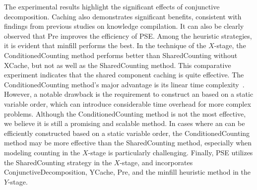 The experimental results highlight the significant effects of conjunctive decomposition.
Caching also demonstrates significant benefits, consistent with findings from previous studies on knowledge compilation. 
It can also be clearly observed that \textsf{Pre} improves the efficiency of PSE.
Among the heuristic strategies, it is evident that \textsf{minfill} performs the best.
In the technique of the $X$-stage, the \textsf{ConditionedCounting} method performs better than \textsf{SharedCounting} without \textsf{XCache}, but not as well as the \textsf{SharedCounting} method.
This comparative experiment indicates that the shared component caching is quite effective.
The \textsf{ConditionedCounting} method's major advantage is its linear time complexity~\cite{lai2017new}. However, a notable drawback is the requirement to construct an \ADDAND based on a static variable order, which can introduce considerable time overhead for more complex problems. %
Although the \textsf{ConditionedCounting} method is not the most effective, we believe it is still a promising and scalable method. 
In cases where an \ADDAND can be efficiently constructed based on a static variable order, the \textsf{ConditionedCounting} method may be more effective than the \textsf{SharedCounting} method, especially when modeling counting in the $X$-stage is particularly challenging.
Finally, PSE utilizes the \textsf{SharedCounting} strategy in the $X$-stage, and incorporates  \textsf{ConjunctiveDecomposition}, \textsf{YCache}, \textsf{Pre}, and the \textsf{minfill} heuristic method in the $Y$-stage.
	



